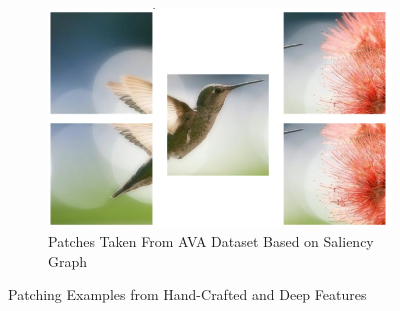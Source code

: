 \begin{figure}
\begin{subfigure}[b]{0.25\textwidth}
        \includegraphics[width=\textwidth]{figures/Literature Review/alamp_bird.png}
        \caption{Patches Taken From AVA Dataset Based on Saliency Graph \cite{Ma2017}}
        \label{fig:alamp_patches}
    \end{subfigure}
    \caption{ Patching Examples from Hand-Crafted \cite{Yan2013} and Deep Features   \cite{Ma2017}}
\end{figure}



